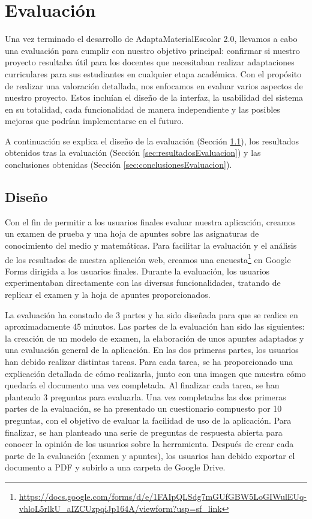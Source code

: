 \chapter{Evaluación}
\label{cap:evaluacion}
Una vez terminado el desarrollo de AdaptaMaterialEscolar 2.0, llevamos a cabo una evaluación para cumplir con nuestro objetivo principal: confirmar si nuestro proyecto resultaba útil para los docentes que necesitaban realizar adaptaciones curriculares para sus estudiantes en cualquier etapa académica. Con el propósito de realizar una valoración detallada, nos enfocamos en evaluar varios aspectos de nuestro proyecto. Estos incluían el diseño de la interfaz, la usabilidad del sistema en su totalidad, cada funcionalidad de manera independiente y las posibles mejoras que podrían implementarse en el futuro.

A continuación se explica el diseño de la evaluación (Sección \ref{sec:disenyoEvaluacion}), los resultados obtenidos tras la evaluación (Sección \ref{sec:resultadosEvaluacion}) y las conclusiones obtenidas (Sección \ref{sec:conclusionesEvaluacion}).

\section{Diseño}\label{sec:disenyoEvaluacion}
Con el fin de permitir a los usuarios finales evaluar nuestra aplicación, creamos un examen de prueba y una hoja de apuntes sobre las asignaturas de conocimiento del medio y matemáticas.
Para facilitar la evaluación y el análisis de los resultados de nuestra aplicación web, creamos una encuesta\footnote{\url{https://docs.google.com/forms/d/e/1FAIpQLSdg7mGUfGBW5LoGIWulEUq-vhloL5rlkU_aIZCUzpqiJp164A/viewform?usp=sf_link}} en Google Forms dirigida a los usuarios finales. Durante la evaluación, los usuarios experimentaban directamente con las diversas funcionalidades, tratando de replicar el examen y la hoja de apuntes proporcionados.

La evaluación ha constado de 3 partes y ha sido diseñada para que se realice en aproximadamente 45 minutos. Las partes de la evaluación han sido las siguientes: la creación de un modelo de examen, la elaboración de unos apuntes adaptados y una evaluación general de la aplicación. En las dos primeras partes, los usuarios han debido realizar distintas tareas. Para cada tarea, se ha proporcionado una explicación detallada de cómo realizarla, junto con una imagen que muestra cómo quedaría el documento una vez completada. Al finalizar cada tarea, se han planteado 3 preguntas para evaluarla. Una vez completadas las dos primeras partes de la evaluación, se ha presentado un cuestionario compuesto por 10 preguntas, con el objetivo de evaluar la facilidad de uso de la aplicación. Para finalizar, se han planteado una serie de preguntas de respuesta abierta para conocer la opinión de los usuarios sobre la herramienta. Después de crear cada parte de la evaluación (examen y apuntes), los usuarios han debido exportar el documento a PDF y subirlo a una carpeta de Google Drive.

